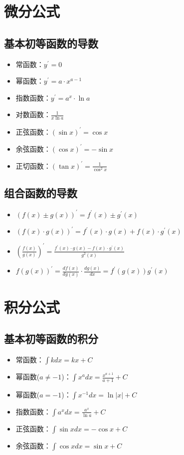 \section{微分公式}

\subsection{基本初等函数的导数}

\begin{itemize}
    \item 常函数：$y^\prime=0$
    \item 幂函数：$y^\prime=a\cdot x^{a-1}$
    \item 指数函数：$y^\prime=a^x\cdot\ln a$
    \item 对数函数：$\frac1{x\ln a}$
    \item 正弦函数：$(\sin x)^\prime=\cos x$
    \item 余弦函数：$(\cos x)^\prime=-\sin x$
    \item 正切函数：$(\tan x)^\prime=\frac1{\cos^2x}$
\end{itemize}

\subsection{组合函数的导数}

\begin{itemize}
    \item $(f(x)\pm g(x))^\prime=f^\prime(x)\pm g^\prime(x)$
    \item $(f(x)\cdot g(x))^\prime=f^\prime(x)\cdot g(x)+f(x)\cdot g^\prime(x)$
    \item $(\frac{f(x)}{g(x)})^\prime=\frac{f^\prime(x)\cdot g(x)-f(x)\cdot g^\prime(x)}{g^2(x)}$
    \item $f(g(x))^\prime=\frac{df(x)}{dg(x)}\cdot\frac{dg(x)}{dx}=f^\prime(g(x))g^\prime(x)$
\end{itemize}

\section{积分公式}

\subsection{基本初等函数的积分}

\begin{itemize}
    \item 常函数：$\int kdx=kx+C$
    \item 幂函数($a\neq-1$)：$\int x^adx=\frac{x^{a+1}}{a+1}+C$
    \item 幂函数($a=-1$)：$\int x^{-1}dx=\ln|x|+C$
    \item 指数函数：$\int a^xdx=\frac{a^x}{\ln a}+C$
    \item 正弦函数：$\int\sin xdx=-\cos x+C$
    \item 余弦函数：$\int\cos xdx=\sin x+C$
\end{itemize}

